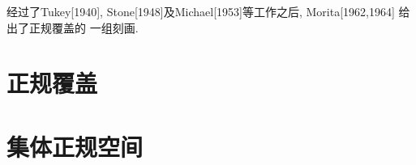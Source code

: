 \documentclass[main.tex]{subfiles}
\begin{document}
经过了Tukey[1940], Stone[1948]及Michael[1953]等工作之后, Morita[1962,1964]
给出了正规覆盖的
一组刻画.


\section{正规覆盖}\label{ch3.1}

	
\section{集体正规空间}\label{ch3.2}

	
\end{document}
